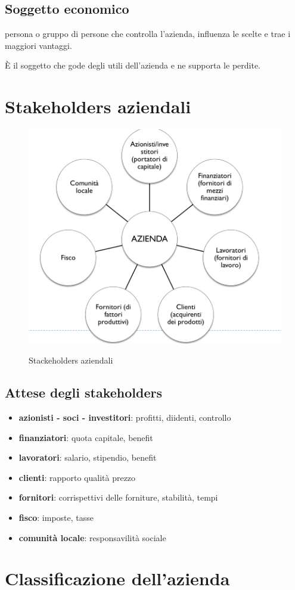 \subsection{Soggetto economico}
persona o gruppo di persone che controlla l'azienda,
influenza le scelte e trae i maggiori vantaggi.

È il soggetto che gode degli utili dell'azienda e ne supporta le perdite.

\section{Stakeholders aziendali}
\begin{figure}[h!]
    \centering
    \includegraphics[width=0.5\linewidth]{img/2022-03-27-11-53-12.png}
    \label{fig:stackeholders}
    \caption{Stackeholders aziendali}
\end{figure}
\subsection{Attese degli stakeholders}
\begin{itemize}
    \item \textbf{azionisti - soci - investitori}: profitti, diidenti, controllo
    \item \textbf{finanziatori}: quota capitale, benefit
    \item \textbf{lavoratori}: salario, stipendio, benefit
    \item \textbf{clienti}: rapporto qualità prezzo
    \item \textbf{fornitori}: corrispettivi delle forniture, stabilità, tempi
    \item \textbf{fisco}: imposte, tasse
    \item \textbf{comunità locale}: responsavilità sociale
\end{itemize}
\pagebreak


\section{Classificazione dell'azienda}

